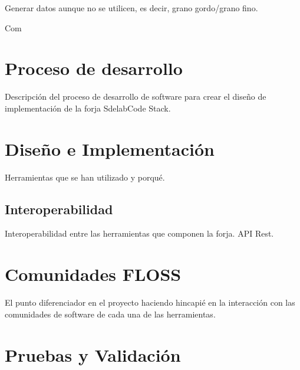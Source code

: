 \documentclass[11pt]{scrartcl}
\begin{document}
\par Generar datos aunque no se utilicen, es decir, grano gordo/grano fino.

\par Com


\section{Proceso de desarrollo}
\label{sec:procesodesarrollo}

\par Descripci\'on del proceso de desarrollo de software para crear el diseño de implementaci\'on de la forja SdelabCode Stack.



\section{Dise\~no e Implementaci\'on}
\label{sec:diseno}

\par Herramientas que se han utilizado y porqu\'e.


\subsection{Interoperabilidad}
\label{sub:interoperabilidad}

\par Interoperabilidad entre las herramientas que componen la forja. API Rest.


\section{Comunidades FLOSS}
\label{sec:comunidades}

\par El punto diferenciador en el proyecto haciendo hincapi\'e en la interacci\'on con las comunidades de software de cada una de las herramientas.


\section{Pruebas y Validaci\'on}
\label{sec:pruebas}
\end{document}
